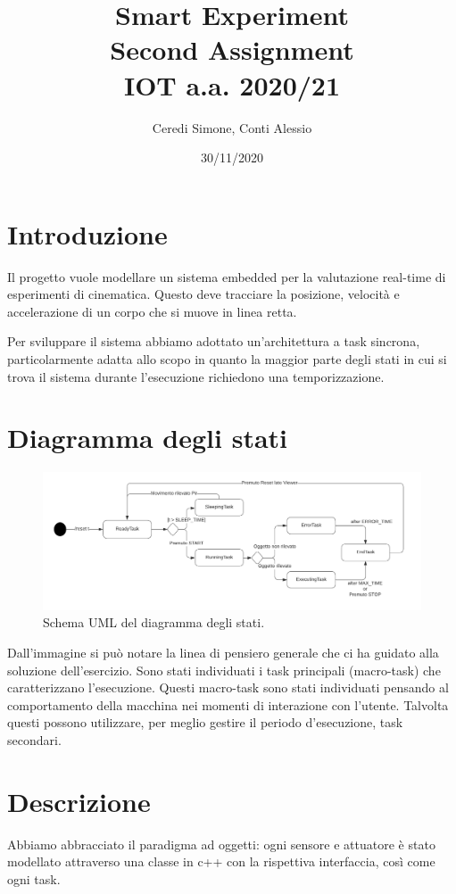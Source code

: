 \documentclass[a4paper,12pt]{report}
\title{Smart Experiment\\Second Assignment\\IOT a.a. 2020/21}
\author{Ceredi Simone, Conti Alessio}
\date{30/11/2020}
\begin{document}
 
\maketitle

\chapter{Introduzione}
Il progetto vuole modellare un sistema embedded per la valutazione real-time di esperimenti di cinematica.
Questo deve tracciare la posizione, velocità e accelerazione di un corpo che si muove in linea retta. 

Per sviluppare il sistema abbiamo adottato un'architettura a task sincrona, particolarmente adatta allo scopo in quanto la maggior parte degli stati in cui si trova il sistema durante l'esecuzione richiedono una temporizzazione.

\chapter{Diagramma degli stati}
\begin{figure}
\centering{}
\includegraphics[width=\textwidth]{state_diagram.pdf}
\caption{Schema UML del diagramma degli stati.}
\label{img:state diagram}
\end{figure}
Dall'immagine si può notare la linea di pensiero generale che ci ha guidato alla soluzione dell'esercizio.
Sono stati individuati i task principali (macro-task) che caratterizzano l'esecuzione.
Questi macro-task sono stati individuati pensando al comportamento della macchina nei momenti di interazione con l'utente. 
Talvolta questi possono utilizzare, per meglio gestire il periodo d'esecuzione, task secondari.


\chapter{Descrizione}
Abbiamo abbracciato il paradigma ad oggetti: ogni sensore e attuatore è stato modellato attraverso una classe in c++ con la rispettiva interfaccia, così come ogni task.
\end{document}
